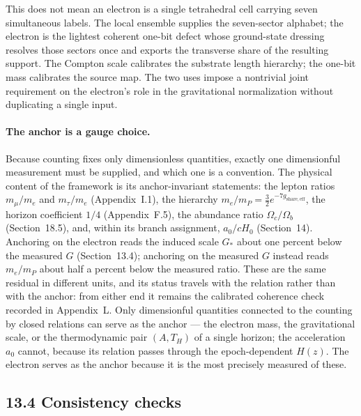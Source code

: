 \documentclass[11pt]{article}
\begin{document}
This does not mean an electron is a single tetrahedral cell carrying seven simultaneous labels. The local ensemble supplies the seven-sector alphabet; the electron is the lightest coherent one-bit defect whose ground-state dressing resolves those sectors once and exports the transverse share of the resulting support. The Compton scale calibrates the substrate length hierarchy; the one-bit mass calibrates the source map. The two uses impose a nontrivial joint requirement on the electron's role in the gravitational normalization without duplicating a single input.

\paragraph{The anchor is a gauge choice.}
Because counting fixes only dimensionless quantities, exactly one dimensionful measurement must be supplied, and which one is a convention. The physical content of the framework is its anchor-invariant statements: the lepton ratios $m_\mu/m_e$ and $m_\tau/m_e$ (Appendix~I.1), the hierarchy $m_e/m_P=\tfrac32e^{-7g_{\mathrm{share,eff}}}$, the horizon coefficient $1/4$ (Appendix~F.5), the abundance ratio $\Omega_c/\Omega_b$ (Section~18.5), and, within its branch assignment, $a_0/cH_0$ (Section~14). Anchoring on the electron reads the induced scale $G_*$ about one percent below the measured $G$ (Section~13.4); anchoring on the measured $G$ instead reads $m_e/m_P$ about half a percent below the measured ratio. These are the same residual in different units, and its status travels with the relation rather than with the anchor: from either end it remains the calibrated coherence check recorded in Appendix~L. Only dimensionful quantities connected to the counting by closed relations can serve as the anchor --- the electron mass, the gravitational scale, or the thermodynamic pair $(A,T_H)$ of a single horizon; the acceleration $a_0$ cannot, because its relation passes through the epoch-dependent $H(z)$. The electron serves as the anchor because it is the most precisely measured of these.

\subsection{13.4 Consistency checks}
\end{document}
